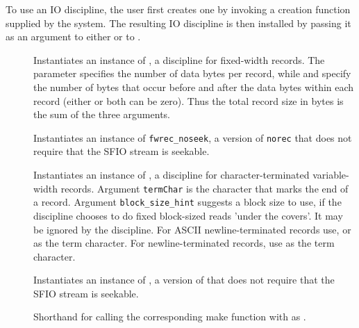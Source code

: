 To use an IO discipline, the user first creates one by invoking
a creation function supplied by the \pads{} system.  The resulting IO
discipline is then installed by passing it as an argument to either
 or to .

\begin{description}
\item
[\small{}]
 Instantiates an instance of , a discipline for fixed-width
 records.  The parameter  specifies the number of data bytes per record,
 while  and  specify the number of bytes that
 occur before and after the data bytes within each record (either or
 both can be zero).  Thus the total record size in bytes is the sum
 of the three arguments.  

\item[\small{}]
Instantiates an instance of \texttt{fwrec\_noseek}, a version of \texttt{norec}
that does not require that the SFIO stream is seekable.

\item[\small{}]
Instantiates an instance of , a discipline for
character-terminated variable-width records. Argument \texttt{termChar} is the
character that marks the end of a record. Argument
\texttt{block\_size\_hint} suggests a block size to use, if the
discipline chooses to do fixed block-sized reads 'under the covers'.
It may be ignored by the discipline.
For ASCII newline-terminated records use,  or
as the term character.  For  newline-terminated records, use
 as the term character.


\item[\small{}] 
Instantiates an instance of , a version of 
that does not require that the SFIO stream is seekable.

\item[\small{}]
Shorthand for calling the corresponding  make function with
 as .


\end{description}

